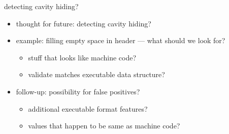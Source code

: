 \begin{frame}{detecting cavity hiding?}
    \begin{itemize}
    \item thought for future: detecting cavity hiding?
    \vspace{.5cm}
    \item example: filling empty space in header --- what should we look for?
        \begin{itemize}
        \item<2-> stuff that looks like machine code?
        \item<2-> validate matches executable data structure?
        \end{itemize}
    \vspace{.5cm}
    \item<3-> follow-up: possibility for false positives?
        \begin{itemize}
        \item<4-> additional executable format features?
        \item<4-> values that happen to be same as machine code?
        \end{itemize}
    \end{itemize}
\end{frame}
